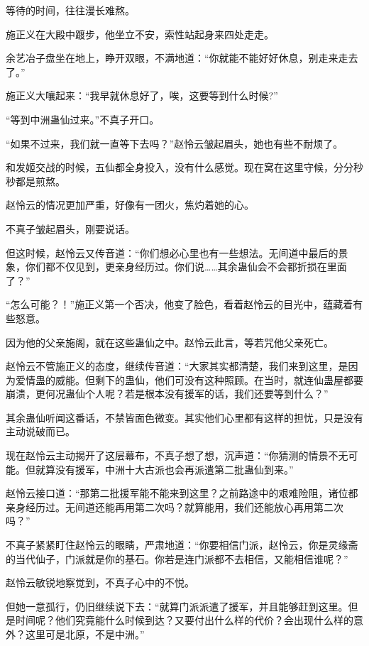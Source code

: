 
\begin{this_body}

等待的时间，往往漫长难熬。

施正义在大殿中踱步，他坐立不安，索性站起身来四处走走。

余艺冶子盘坐在地上，睁开双眼，不满地道：“你就能不能好好休息，别走来走去了。”

施正义大嚷起来：“我早就休息好了，唉，这要等到什么时候?”

“等到中洲蛊仙过来。”不真子开口。

“如果不过来，我们就一直等下去吗？”赵怜云皱起眉头，她也有些不耐烦了。

和发姬交战的时候，五仙都全身投入，没有什么感觉。现在窝在这里守候，分分秒秒都是煎熬。

赵怜云的情况更加严重，好像有一团火，焦灼着她的心。

不真子皱起眉头，刚要说话。

但这时候，赵怜云又传音道：“你们想必心里也有一些想法。无间道中最后的景象，你们都不仅见到，更亲身经历过。你们说……其余蛊仙会不会都折损在里面了？”

“怎么可能？！”施正义第一个否决，他变了脸色，看着赵怜云的目光中，蕴藏着有些怒意。

因为他的父亲施阁，就在这些蛊仙之中。赵怜云此言，等若咒他父亲死亡。

赵怜云不管施正义的态度，继续传音道：“大家其实都清楚，我们来到这里，是因为爱情蛊的威能。但剩下的蛊仙，他们可没有这种照顾。在当时，就连仙蛊屋都要崩溃，更何况蛊仙个人呢？若是根本没有援军的话，我们还要等到什么？”

其余蛊仙听闻这番话，不禁皆面色微变。其实他们心里都有这样的担忧，只是没有主动说破而已。

现在赵怜云主动揭开了这层幕布，不真子想了想，沉声道：“你猜测的情景不无可能。但就算没有援军，中洲十大古派也会再派遣第二批蛊仙到来。”

赵怜云接口道：“那第二批援军能不能来到这里？之前路途中的艰难险阻，诸位都亲身经历过。无间道还能再用第二次吗？就算能用，我们还能放心再用第二次吗？”

不真子紧紧盯住赵怜云的眼睛，严肃地道：“你要相信门派，赵怜云，你是灵缘斋的当代仙子，门派就是你的基石。你若是连门派都不去相信，又能相信谁呢？”

赵怜云敏锐地察觉到，不真子心中的不悦。

但她一意孤行，仍旧继续说下去：“就算门派派遣了援军，并且能够赶到这里。但是时间呢？他们究竟能什么时候到达？又要付出什么样的代价？会出现什么样的意外？这里可是北原，不是中洲。”


\end{this_body}
